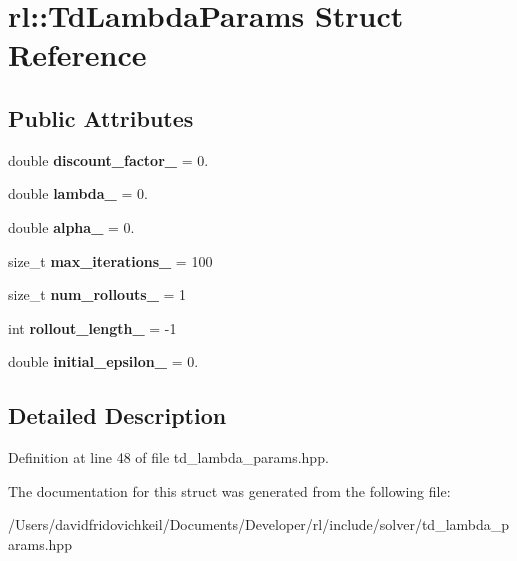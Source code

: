 \hypertarget{structrl_1_1_td_lambda_params}{}\section{rl\+:\+:Td\+Lambda\+Params Struct Reference}
\label{structrl_1_1_td_lambda_params}
\subsection*{Public Attributes}
\begin{DoxyCompactItemize}
\item 
\hypertarget{structrl_1_1_td_lambda_params_ad5fcee919295c90b2a703e938869a709}{}\label{structrl_1_1_td_lambda_params_ad5fcee919295c90b2a703e938869a709} 
double {\bfseries discount\+\_\+factor\+\_\+} = 0.
\item 
\hypertarget{structrl_1_1_td_lambda_params_aac69c9c13f56e139a88282ebcb9c1d2b}{}\label{structrl_1_1_td_lambda_params_aac69c9c13f56e139a88282ebcb9c1d2b} 
double {\bfseries lambda\+\_\+} = 0.
\item 
\hypertarget{structrl_1_1_td_lambda_params_a40c12a22c1fbbc8891bb9530b5abf511}{}\label{structrl_1_1_td_lambda_params_a40c12a22c1fbbc8891bb9530b5abf511} 
double {\bfseries alpha\+\_\+} = 0.
\item 
\hypertarget{structrl_1_1_td_lambda_params_a9dd04e2caf114f91f18c5f63793d547f}{}\label{structrl_1_1_td_lambda_params_a9dd04e2caf114f91f18c5f63793d547f} 
size\+\_\+t {\bfseries max\+\_\+iterations\+\_\+} = 100
\item 
\hypertarget{structrl_1_1_td_lambda_params_aa0168143470bf2dc81a52c59b103643a}{}\label{structrl_1_1_td_lambda_params_aa0168143470bf2dc81a52c59b103643a} 
size\+\_\+t {\bfseries num\+\_\+rollouts\+\_\+} = 1
\item 
\hypertarget{structrl_1_1_td_lambda_params_af1b8ab6c28edb093672fd6799675c3f4}{}\label{structrl_1_1_td_lambda_params_af1b8ab6c28edb093672fd6799675c3f4} 
int {\bfseries rollout\+\_\+length\+\_\+} = -\/1
\item 
\hypertarget{structrl_1_1_td_lambda_params_a11c7b952f11629bb5f18dd52648a4277}{}\label{structrl_1_1_td_lambda_params_a11c7b952f11629bb5f18dd52648a4277} 
double {\bfseries initial\+\_\+epsilon\+\_\+} = 0.
\end{DoxyCompactItemize}


\subsection{Detailed Description}


Definition at line 48 of file td\+\_\+lambda\+\_\+params.\+hpp.



The documentation for this struct was generated from the following file\+:\begin{DoxyCompactItemize}
\item 
/\+Users/davidfridovichkeil/\+Documents/\+Developer/rl/include/solver/td\+\_\+lambda\+\_\+params.\+hpp\end{DoxyCompactItemize}
